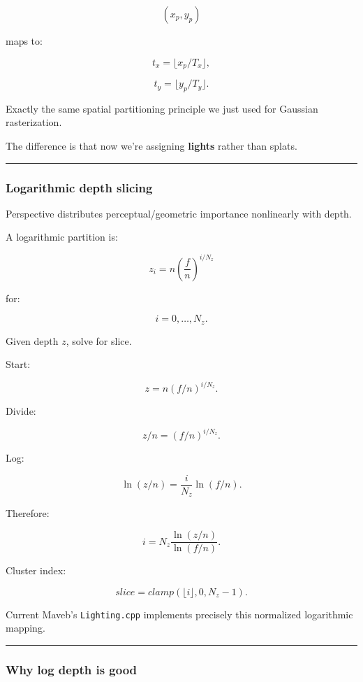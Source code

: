 \[
(x_p,y_p)
\]

maps to:

\[
t_x=
\lfloor x_p/T_x\rfloor,
\]

\[
t_y=
\lfloor y_p/T_y\rfloor.
\]

Exactly the same spatial partitioning principle we just used for Gaussian rasterization.

The difference is that now we're assigning \textbf{lights} rather than splats.

\begin{center}\rule{0.5\linewidth}{0.5pt}\end{center}

\subsubsection{Logarithmic depth slicing}\label{logarithmic-depth-slicing}

Perspective distributes perceptual/geometric importance nonlinearly with depth.

A logarithmic partition is:

\[
\boxed{
z_i
=
n
\left(
\frac fn
\right)^{i/N_z}
}
\]

for:

\[
i=0,\dots,N_z.
\]

Given depth \(z\), solve for slice.

Start:

\[
z=
n(f/n)^{i/N_z}.
\]

Divide:

\[
z/n=
(f/n)^{i/N_z}.
\]

Log:

\[
\ln(z/n)
=
\frac i{N_z}
\ln(f/n).
\]

Therefore:

\[
\boxed{
i
=
N_z
\frac{
\ln(z/n)
}{
\ln(f/n)
}.
}
\]

Cluster index:

\[
slice=
clamp(
\lfloor i\rfloor,
0,
N_z-1
).
\]

Current Maveb's \texttt{Lighting.cpp} implements precisely this normalized logarithmic mapping.

\begin{center}\rule{0.5\linewidth}{0.5pt}\end{center}

\subsubsection{Why log depth is good}\label{why-log-depth-is-good}

